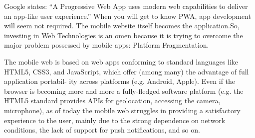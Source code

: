 \documentclass[14pt,a4paper,final]{extreport}
\begin{document}
\item 
Google states: “A Progressive Web App uses modern web capabilities to deliver an app-like user experience.” When you will get to know PWA, app development will seem not required. The mobile website itself becomes the application.So, investing in Web Technologies is an omen because it is trying to overcome the major problem possessed by mobile apps: Platform Fragmentation.
\newline
\item

The mobile web is based on web apps conforming to
standard languages like HTML5, CSS3, and JavaScript, which offer (among many) the advantage of full application portabil-
ity across platforms (e.g. Android, Apple). Even if the browser is becoming more and more a fully-fledged software platform
(e.g. the HTML5 standard provides APIs for geolocation,
accessing the camera, microphone), as of today the mobile web
struggles in providing a satisfactory experience to the user,
mainly due to the strong dependence on network conditions,
the lack of support for push notifications, and so on.

\newpage
\end{document}

